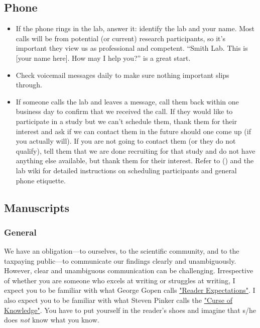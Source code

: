 \documentclass[letterpaper,12pt,oneside]{memoir}
\begin{document}
\subsection{Phone}

\begin{itemize}
\item If the phone rings in the lab, answer it: identify the lab and your name. Most calls will be from potential (or current) research participants, so it's important they view us as professional and competent. ``Smith Lab. This is [your name here]. How may I help you?'' is a great start. 

\item Check voicemail messages daily to make sure nothing important slips through.

\item If someone calls the lab and leaves a message, call them back within one business day to confirm that we received the call. If they would like to participate in a study but we can't schedule them, thank them for their interest and ask if we can contact them in the future should one come up (if you actually will). If you are not going to contact them (or they do not qualify), tell them that we are done recruiting for that study and do not have anything else available, but thank them for their interest. Refer to  () and the lab wiki for detailed instructions on scheduling participants and general phone etiquette.

\end{itemize}



\subsection{Manuscripts}

\subsubsection{General}

We have an obligation---to ourselves, to the scientific community, and to the taxpaying public---to communicate our findings clearly and unambiguously. However, clear and unambiguous communication can be challenging. Irrespective of whether you are someone who excels at writing or struggles at writing, I expect you to be familiar with what George Gopen calls \href{https://cseweb.ucsd.edu/~swanson/papers/science-of-writing.pdf}{"Reader Expectations"}. I also expect you to be familiar with what Steven Pinker calls the \href{https://stevenpinker.com/files/pinker/files/why_academics_stink_at_writing.pdf}{"Curse of Knowledge"}. You have to put yourself in the reader's shoes and imagine that s/he does \textit{not} know what you know. 
\end{document}
